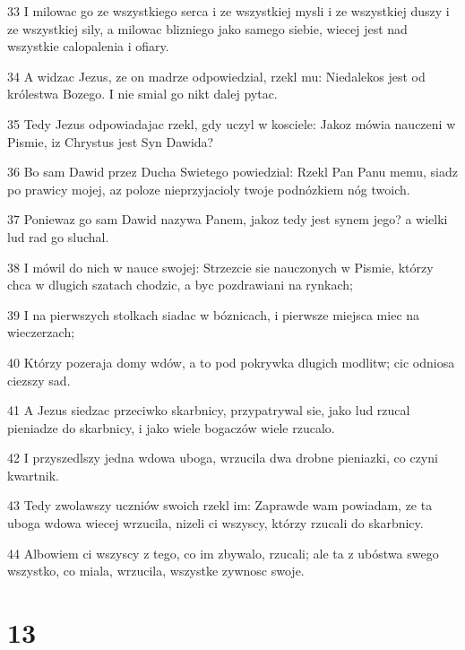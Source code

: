 \par 33 I milowac go ze wszystkiego serca i ze wszystkiej mysli i ze wszystkiej duszy i ze wszystkiej sily, a milowac blizniego jako samego siebie, wiecej jest nad wszystkie calopalenia i ofiary.
\par 34 A widzac Jezus, ze on madrze odpowiedzial, rzekl mu: Niedalekos jest od królestwa Bozego. I nie smial go nikt dalej pytac.
\par 35 Tedy Jezus odpowiadajac rzekl, gdy uczyl w kosciele: Jakoz mówia nauczeni w Pismie, iz Chrystus jest Syn Dawida?
\par 36 Bo sam Dawid przez Ducha Swietego powiedzial: Rzekl Pan Panu memu, siadz po prawicy mojej, az poloze nieprzyjacioly twoje podnózkiem nóg twoich.
\par 37 Poniewaz go sam Dawid nazywa Panem, jakoz tedy jest synem jego? a wielki lud rad go sluchal.
\par 38 I mówil do nich w nauce swojej: Strzezcie sie nauczonych w Pismie, którzy chca w dlugich szatach chodzic, a byc pozdrawiani na rynkach;
\par 39 I na pierwszych stolkach siadac w bóznicach, i pierwsze miejsca miec na wieczerzach;
\par 40 Którzy pozeraja domy wdów, a to pod pokrywka dlugich modlitw; cic odniosa ciezszy sad.
\par 41 A Jezus siedzac przeciwko skarbnicy, przypatrywal sie, jako lud rzucal pieniadze do skarbnicy, i jako wiele bogaczów wiele rzucalo.
\par 42 I przyszedlszy jedna wdowa uboga, wrzucila dwa drobne pieniazki, co czyni kwartnik.
\par 43 Tedy zwolawszy uczniów swoich rzekl im: Zaprawde wam powiadam, ze ta uboga wdowa wiecej wrzucila, nizeli ci wszyscy, którzy rzucali do skarbnicy.
\par 44 Albowiem ci wszyscy z tego, co im zbywalo, rzucali; ale ta z ubóstwa swego wszystko, co miala, wrzucila, wszystke zywnosc swoje.

\chapter{13}

